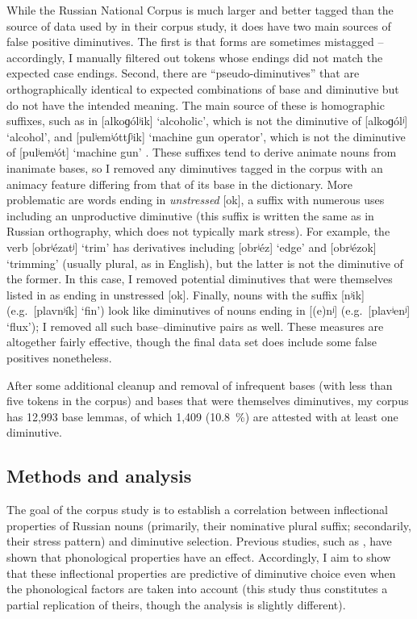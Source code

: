 \documentclass[output=paper,colorlinks,citecolor=brown
]{langscibook}
\begin{document}
While the Russian National Corpus is much larger and better tagged than the source of data used by \citet{Gouskova.etal2015} in their corpus study, it does have two main sources of false positive diminutives. The first is that forms are sometimes mistagged -- accordingly, I manually filtered out tokens whose endings did not match the expected case endings. Second, there are ``pseudo-diminutives'' that are orthographically identical to expected combinations of base and diminutive but do not have the intended meaning. The main source of these is homographic suffixes, such as in [alkoɡólʲik] `alcoholic', which is not the diminutive of [alkoɡólʲ] `alcohol', and [pulʲemʲóttʃʲik] `machine gun operator', which is not the diminutive of [pulʲemʲót] `machine gun' \citep[cf.][]{Gouskova.etal2015,GuzmanNaranjo2019}. These suffixes tend to derive animate nouns from inanimate bases, so I removed any diminutives tagged in the corpus with an animacy feature differing from that of its base in the dictionary. More problematic are words ending in \emph{unstressed} [ok], a suffix with numerous uses including an unproductive diminutive (this suffix is written the same as \ok{} in Russian orthography, which does not typically mark stress). For example, the verb [obrʲézatʲ] `trim' has derivatives including [obrʲéz] `edge' and [obrʲézok] `trimming' (usually plural, as in English), but the latter is not the diminutive of the former. In this case, I removed potential diminutives that were themselves listed in \citet{Zaliznjak1977} as ending in unstressed [ok]. Finally, nouns with the suffix [nʲik] (e.g.\ [plavnʲík] `fin') look like diminutives of nouns ending in [(e)nʲ] (e.g.\ [plavʲenʲ] `flux'); I removed all such base--diminutive pairs as well. These measures are altogether fairly effective, though the final data set does include some false positives nonetheless.

After some additional cleanup and removal of infrequent bases (with less than five tokens in the corpus) and bases that were themselves diminutives, my corpus has 12,993 base lemmas, of which 1,409 (\qty{10.8}{\percent}) are attested with at least one diminutive.

\subsection{Methods and analysis}\label{sec:corpanal}
The goal of the corpus study is to establish a correlation between inflectional properties of Russian nouns (primarily, their nominative plural suffix; secondarily, their stress pattern) and diminutive selection. Previous studies, such as \citet{Gouskova.etal2015}, have shown that phonological properties have an effect. Accordingly, I aim to show that these inflectional properties are predictive of diminutive choice even when the phonological factors are taken into account (this study thus constitutes a partial replication of theirs, though the analysis is slightly different).
\end{document}
